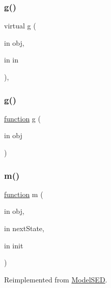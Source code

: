\subsubsection{\texorpdfstring{g()}{g()}\hspace{0.1cm}{\footnotesize\ttfamily [1/2]}}
{\footnotesize\ttfamily virtual g (\begin{DoxyParamCaption}\item[{in}]{obj,  }\item[{in}]{in }\end{DoxyParamCaption})\hspace{0.3cm}{\ttfamily [virtual]}, {\ttfamily [inherited]}}

\mbox{\label{class_model_laby_a07dadfabe92bf9a144b8a862720e7746}} 
\subsubsection{\texorpdfstring{g()}{g()}\hspace{0.1cm}{\footnotesize\ttfamily [2/2]}}
{\footnotesize\ttfamily \hyperlink{_plan__desuma_functions__2_players_8m_ac2ffb26d6f42d3bbcd7847b0873403f4}{function} g (\begin{DoxyParamCaption}\item[{in}]{obj }\end{DoxyParamCaption})}

\mbox{\label{class_model_laby_a3140f24c6c4b80037b7d4f521c6ae2d3}} 
\subsubsection{\texorpdfstring{m()}{m()}}
{\footnotesize\ttfamily \hyperlink{_plan__desuma_functions__2_players_8m_ac2ffb26d6f42d3bbcd7847b0873403f4}{function} m (\begin{DoxyParamCaption}\item[{in}]{obj,  }\item[{in}]{next\+State,  }\item[{in}]{init }\end{DoxyParamCaption})\hspace{0.3cm}{\ttfamily [virtual]}}



Reimplemented from \hyperlink{class_model_s_e_d_adb8aaccb857cf5bbec640cd00915459d}{Model\+S\+ED}.

